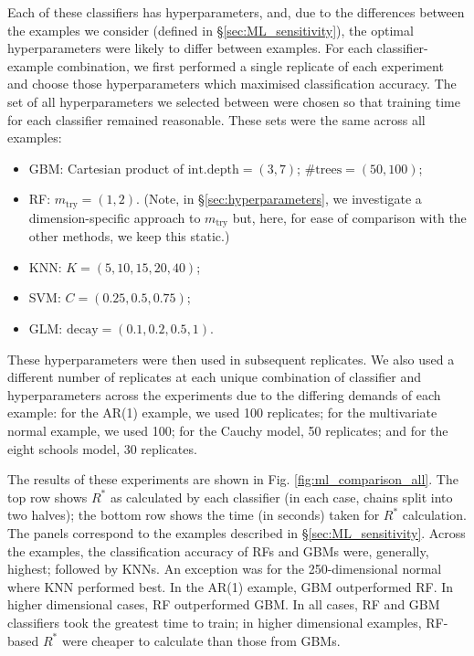 \documentclass{article}
\begin{document}
Each of these classifiers has hyperparameters, and, due to the differences between the examples we consider (defined in \S\ref{sec:ML_sensitivity}), the optimal hyperparameters were likely to differ between examples. For each classifier-example combination, we first performed a single replicate of each experiment and choose those hyperparameters which maximised classification accuracy. The set of all hyperparameters we selected between were chosen so that training time for each classifier remained reasonable. These sets were the same across all examples:

\begin{itemize}
	\item GBM: Cartesian product of $\text{int.depth}=(3, 7)$; $\text{\# trees} = (50, 100)$;
	\item RF: $m_{\text{try}} = (1, 2)$. (Note, in \S\ref{sec:hyperparameters}, we investigate a dimension-specific approach to $m_{\text{try}}$ but, here, for ease of comparison with the other methods, we keep this static.)
	\item KNN: $K=(5,10,15, 20,40)$;
	\item SVM: $C=(0.25, 0.5, 0.75)$;
	\item GLM: $\text{decay}=(0.1, 0.2, 0.5, 1)$.
\end{itemize}

These hyperparameters were then used in subsequent replicates. We also used a different number of replicates at each unique combination of classifier and hyperparameters across the experiments due to the differing demands of each example: for the AR(1) example, we used 100 replicates; for the multivariate normal example, we used 100; for the Cauchy model, 50 replicates; and for the eight schools model, 30 replicates.

The results of these experiments are shown in Fig. \ref{fig:ml_comparison_all}. The top row shows $R^*$ as calculated by each classifier (in each case, chains split into two halves); the bottom row shows the time (in seconds) taken for $R^*$ calculation. The panels correspond to the examples described in \S\ref{sec:ML_sensitivity}. Across the examples, the classification accuracy of RFs and GBMs were, generally, highest; followed by KNNs. An exception was for the 250-dimensional normal where KNN performed best. In the AR(1) example, GBM outperformed RF. In higher dimensional cases, RF outperformed GBM. In all cases, RF and GBM classifiers took the greatest time to train; in higher dimensional examples, RF-based $R^*$ were cheaper to calculate than those from GBMs.
\end{document}
